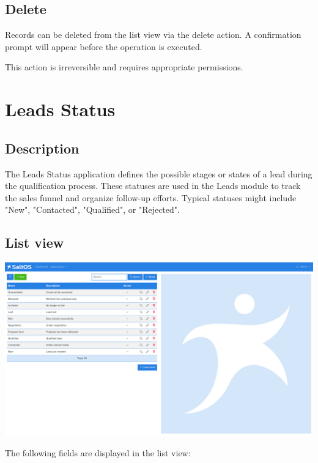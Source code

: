 \documentclass[a4paper]{article}
\begin{document}
\hypertarget{toc60}{}
\subsection{Delete}

Records can be deleted from the list view via the delete action.
A confirmation prompt will appear before the operation is executed.

This action is irreversible and requires appropriate permissions.


\hypertarget{toc61}{}
\section{Leads Status}

\hypertarget{toc62}{}
\subsection{Description}

The Leads Status application defines the possible stages or states of a lead during the qualification process.
These statuses are used in the Leads module to track the sales funnel and organize follow-up efforts.
Typical statuses might include "New", "Contacted", "Qualified", or "Rejected".

\hypertarget{toc63}{}
\subsection{List view}

\begin{center}\includegraphics[width=1\textwidth]{../ujest/snaps/test-screenshots-js-screenshots-crm-leads-status-list-en-us-1-snap.png}\end{center}

The following fields are displayed in the list view:
\end{document}
